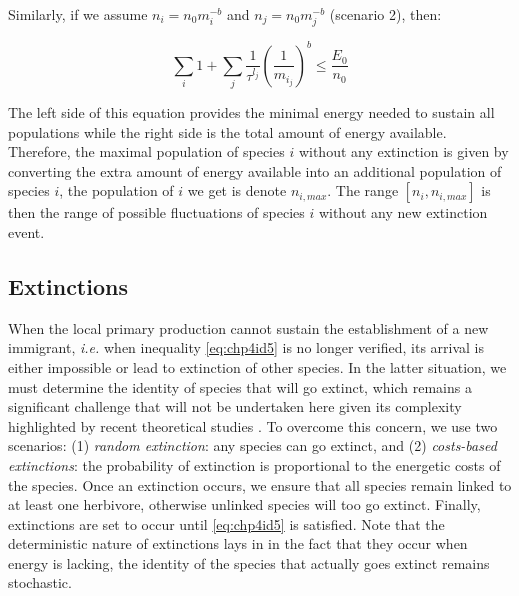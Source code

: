 Similarly, if we assume \(n_i=n_0m_i^{-b}\) and \(n_j=n_0m_j^{-b}\)
(scenario 2), then:

\begin{equation} \sum_i 1 + \sum_j \frac{1}{\tau^{l_j}} \left( \frac{1}{m_{i_j}} \right)^b \leq \frac{E_0}{n_0} \label{eq:chp4id5b}\end{equation}

The left side of this equation provides the minimal energy needed to
sustain all populations while the right side is the total amount of
energy available. Therefore, the maximal population of species \(i\)
without any extinction is given by converting the extra amount of energy
available into an additional population of species \(i\), the population
of \(i\) we get is denote \(n_{i,max}\). The range \([n_i, n_{i, max}]\)
is then the range of possible fluctuations of species \(i\) without any
new extinction event.

\subsection{Extinctions}\label{extinctions}

When the local primary production cannot sustain the establishment of a
new immigrant, \emph{i.e.} when inequality \ref{eq:chp4id5} is no longer
verified, its arrival is either impossible or lead to extinction of
other species. In the latter situation, we must determine the identity
of species that will go extinct, which remains a significant challenge
that will not be undertaken here given its complexity highlighted by
recent theoretical studies \citep{Saterberg2013, Zhao2016}. To overcome
this concern, we use two scenarios: (1) \emph{random extinction}: any
species can go extinct, and (2) \emph{costs-based extinctions}: the
probability of extinction is proportional to the energetic costs of the
species. Once an extinction occurs, we ensure that all species remain
linked to at least one herbivore, otherwise unlinked species will too go
extinct. Finally, extinctions are set to occur until \ref{eq:chp4id5} is
satisfied. Note that the deterministic nature of extinctions lays in in
the fact that they occur when energy is lacking, the identity of the
species that actually goes extinct remains stochastic.



